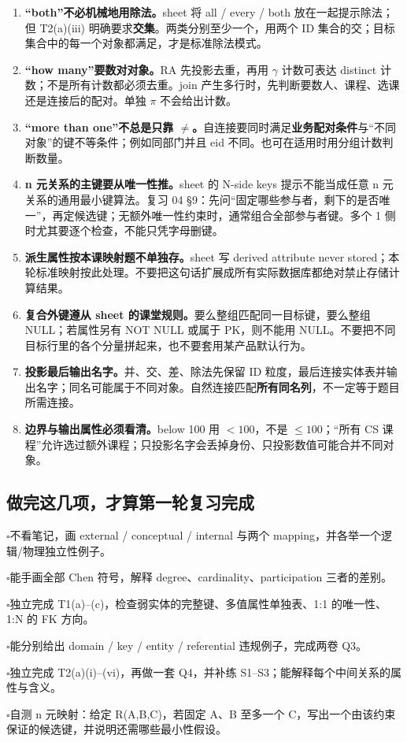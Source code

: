 \documentclass[11pt,a4paper]{article}
\newcommand{\ck}{\(\square\)\;}
\begin{document}
\begin{enumerate}
\item \textbf{“both”不必机械地用除法。}sheet 将 all / every / both 放在一起提示除法；但 T2(a)(iii) 明确要求\textbf{交集}。两类分别至少一个，用两个 ID 集合的交；目标集合中的每一个对象都满足，才是标准除法模式。
\item \textbf{“how many”要数对对象。}RA 先投影去重，再用 $\gamma$ 计数可表达 distinct 计数；不是所有计数都必须去重。join 产生多行时，先判断要数人、课程、选课还是连接后的配对。单独 $\pi$ 不会给出计数。
\item \textbf{“more than one”不总是只靠 $\ne$。}自连接要同时满足\textbf{业务配对条件}与“不同对象”的键不等条件；例如同部门并且 eid 不同。也可在适用时用分组计数判断数量。
\item \textbf{n 元关系的主键要从唯一性推。}sheet 的 N-side keys 提示不能当成任意 n 元关系的通用最小键算法。复习 04 §9：先问“固定哪些参与者，剩下的是否唯一”，再定候选键；无额外唯一性约束时，通常组合全部参与者键。多个 1 侧时尤其要逐个检查，不能只凭字母删键。
\item \textbf{派生属性按本课映射题不单独存。}sheet 写 derived attribute never stored；本轮标准映射按此处理。不要把这句话扩展成所有实际数据库都绝对禁止存储计算结果。
\item \textbf{复合外键遵从 sheet 的课堂规则。}要么整组匹配同一目标键，要么整组 NULL；若属性另有 NOT NULL 或属于 PK，则不能用 NULL。不要把不同目标行里的各个分量拼起来，也不要套用某产品默认行为。
\item \textbf{投影最后输出名字。}并、交、差、除法先保留 ID 粒度，最后连接实体表并输出名字；同名可能属于不同对象。自然连接匹配\textbf{所有同名列}，不一定等于题目所需连接。
\item \textbf{边界与输出属性必须看清。}below 100 用 $<100$，不是 $\le100$；“所有 CS 课程”允许选过额外课程；只投影名字会丢掉身份、只投影数值可能合并不同对象。
\end{enumerate}

\subsection{做完这几项，才算第一轮复习完成}
\ck 不看笔记，画 external / conceptual / internal 与两个 mapping，并各举一个逻辑/物理独立性例子。\par
\ck 能手画全部 Chen 符号，解释 degree、cardinality、participation 三者的差别。\par
\ck 独立完成 T1(a)--(c)，检查弱实体的完整键、多值属性单独表、1:1 的唯一性、1:N 的 FK 方向。\par
\ck 能分别给出 domain / key / entity / referential 违规例子，完成两卷 Q3。\par
\ck 独立完成 T2(a)(i)--(vi)，再做一套 Q4，并补练 S1--S3；能解释每个中间关系的属性与含义。\par
\ck 自测 n 元映射：给定 R(A,B,C)，若固定 A、B 至多一个 C，写出一个由该约束保证的候选键，并说明还需哪些最小性假设。\par
\end{document}
